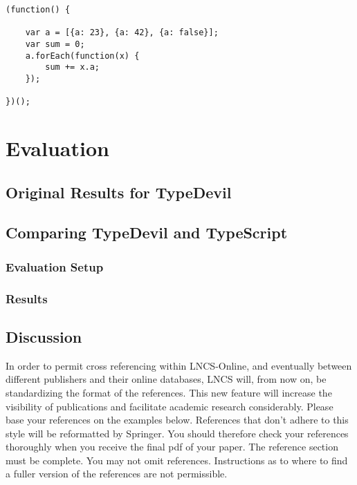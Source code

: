 \documentclass[runningheads,a4paper]{llncs}
\begin{document}
\medskip\medskip
\lstset{language=javascript}
\begin{minipage}{\linewidth}
\begin{lstlisting}[frame=single, caption=inconsistent\_foreach.js]
(function() {
    
    var a = [{a: 23}, {a: 42}, {a: false}];
    var sum = 0;
    a.forEach(function(x) {
        sum += x.a;
    });
    
})();
\end{lstlisting}
\end{minipage}




\section{Evaluation}

\subsection{Original Results for TypeDevil}

\subsection{Comparing TypeDevil and TypeScript} \label{comparison}

\subsubsection{Evaluation Setup}

\subsubsection{Results}


\subsection{Discussion}


In order to permit cross referencing within LNCS-Online, and eventually
between different publishers and their online databases, LNCS will,
from now on, be standardizing the format of the references. This new
feature will increase the visibility of publications and facilitate
academic research considerably. Please base your references on the
examples below. References that don't adhere to this style will be
reformatted by Springer. You should therefore check your references
thoroughly when you receive the final pdf of your paper.
The reference section must be complete. You may not omit references.
Instructions as to where to find a fuller version of the references are
not permissible.
\end{document}
